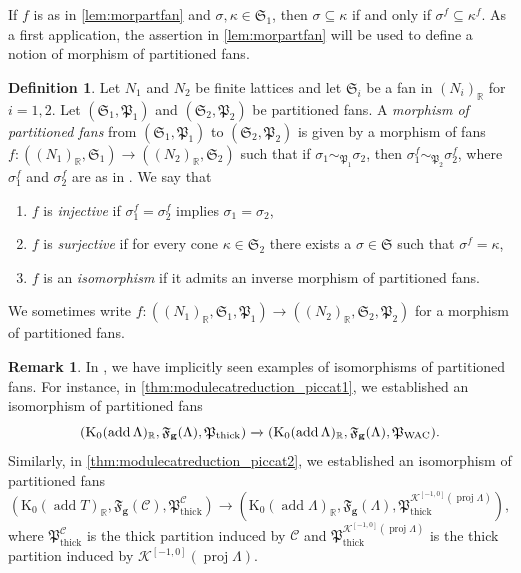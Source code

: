 \documentclass[10pt,twoside, a4paper,reqno]{amsart}
\DeclareMathOperator{\add}{add}
\DeclareMathOperator{\thick}{thick}
\DeclareMathOperator{\proj}{proj}
\newcommand{\Ktwo}{\mathcal{K}^{[-1,0]}}
\newcommand{\partfan}[1]{\mathfrak{F}_{\bfg}(#1)}
\newcommand{\Pfrak}{\mathfrak{P}}
\newcommand{\R}{\mathbb{R}}
\newcommand{\calC}{\mathcal{C}}
\newcommand{\K}{\mathrm{K}}
\newcommand{\bfg}{\mathbf{g}}
\newcommand{\Sfan}{\mathfrak{S}}
\theoremstyle{definition}
\newtheorem{definition}[theorem]{Definition}
\newtheorem{remark}[theorem]{Remark}
\begin{document}
If $f$ is as in \cref{lem:morpartfan} and $\sigma,\kappa\in \Sfan_1$, then $\sigma \subseteq \kappa$ if and only if $\sigma^f \subseteq \kappa^f$. As a first application, the assertion in \cref{lem:morpartfan} will be used to define a notion of morphism of partitioned fans.

\begin{definition}\label{def:morpartfan}
    Let $N_1$ and $N_2$ be finite lattices and let $\Sfan_i$ be a fan in $(N_i)_\R$ for $i=1,2$. Let $(\Sfan_1,\mathfrak{P}_1)$ and $(\Sfan_2,\mathfrak{P}_2)$ be partitioned fans. A \textit{morphism of partitioned fans} from $(\Sfan_1,\mathfrak{P}_1)$ to $(\Sfan_2,\mathfrak{P}_2)$ is given by a morphism of fans $f: ((N_1)_\R,\Sfan_1) \to ((N_2)_\R, \Sfan_2)$ such that
    if $\sigma_1 \sim_{\Pfrak_1} \sigma_2$, then $\sigma_1^f \sim_{\Pfrak_2} \sigma_2^f$, where $\sigma_1^f$ and $\sigma_2^f$ are as in . We say that 
    \begin{enumerate}
        \item $f$ is \textit{injective} if $\sigma_1^f = \sigma_2^f$ implies $\sigma_1 = \sigma_2$,
        \item $f$ is \textit{surjective} if for every cone ${\kappa}\in\Sfan_2$ there exists a $\sigma\in\Sfan$ such that $\sigma^f={\kappa}$,
        \item $f$ is an \textit{isomorphism} if it admits an inverse morphism of partitioned fans.
    \end{enumerate} 
    We sometimes write $f:((N_1)_\R, \Sfan_1, \Pfrak_1) \to ((N_2)_\R, \Sfan_2, \Pfrak_2)$ for a morphism of partitioned fans. 
\end{definition}

\begin{remark}\label{eg:partmorphgivesfunctor_Lambda} 
    In , we have implicitly seen examples of isomorphisms of partitioned fans. For instance, in \eqref{thm:modulecatreduction_piccat1}, we established an isomorphism of partitioned fans
    \[(\K_0(\add \Lambda)_\R,\partfan{\Lambda}, \Pfrak_{\thick})\xrightarrow{} (\K_0(\add \Lambda)_\R, \partfan{\Lambda}, \Pfrak_{\textnormal{WAC}}).\]
    Similarly, in \eqref{thm:modulecatreduction_piccat2}, we established an isomorphism of partitioned fans
    \[ (\K_0(\add T)_\R, \partfan{\calC}, \Pfrak_{\thick}^{\calC}) \to (\K_0(\add \Lambda)_\R, \partfan{\Lambda}, \Pfrak_{\thick}^{\Ktwo(\proj \Lambda)}),\]
    where $\Pfrak_{\thick}^\calC$ is the thick partition induced by $\calC$ and $\Pfrak_{\thick}^{\Ktwo(\proj \Lambda)}$ is the thick partition induced by $\Ktwo(\proj \Lambda)$. 
\end{remark}
\end{document}
